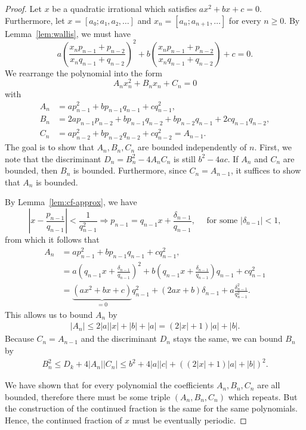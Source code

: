 \begin{proof}
  Let $x$ be a quadratic irrational which satisfies $ax^2 + bx + c = 0$.
  Furthermore, let $x = [a₀; a₁, a₂, …]$ and $x_n = [a_n; a_{n+1}, …]$ for every $n ≥ 0$.
  By Lemma~\ref{lem:wallis}, we must have
  \[
    a \left(\frac{x_n p_{n-1} + p_{n-2}}{x_n q_{n-1} + q_{n-2}}\right)^2
    + b \left(\frac{x_n p_{n-1} + p_{n-2}}{x_n q_{n-1} + q_{n-2}}\right)
    + c = 0.
  \]
  We rearrange the polynomial into the form
  \[
    A_n x_n^2 + B_n x_n + C_n = 0
  \]
  with
  \begin{align*}
    A_n & = a p_{n-1}^2 + b p_{n-1} q_{n-1} + c q_{n-1}^2, \\
    B_n & = 2a p_{n-1} p_{n-2} + b p_{n-1} q_{n-2} + b p_{n-2} q_{n-1} + 2c q_{n-1} q_{n-2}, \\
    C_n & = a p_{n-2}^2 + b p_{n-2} q_{n-2} + c q_{n-2}^2 = A_{n-1}.
  \end{align*}
  The goal is to show that $A_n, B_n, C_n$ are bounded independently of $n$.
  First, we note that the discriminant $D_n = B_n^2 - 4 A_n C_n$ is still $b^2 - 4ac$.
  If $A_n$ and $C_n$ are bounded, then $B_n$ is bounded.
  Furthermore, since $C_n = A_{n-1}$, it suffices to show that $A_n$ is bounded.

  By Lemma~\ref{lem:cf-approx}, we have
  \[
    \left| x - \frac{p_{n-1}}{q_{n-1}} \right| < \frac{1}{q_{n-1}^2}
    \Rightarrow
    p_{n-1} = q_{n-1} x + \frac{δ_{n-1}}{q_{n-1}}, \quad \text{ for some } |δ_{n-1}| < 1,
  \]
  from which it follows that
  \begin{align*}
    A_n & = a p_{n-1}^2 + b p_{n-1} q_{n-1} + c q_{n-1}^2, \\
    & = a \left( q_{n-1} x + \frac{δ_{n-1}}{q_{n-1}} \right)^2 + b \left( q_{n-1} x + \frac{δ_{n-1}}{q_{n-1}} \right) q_{n-1} + c q_{n-1}^2 \\
    & = \underbrace{(ax^2 + bx + c)}_{ = 0} q_{n-1}^2 + (2ax + b) δ_{n-1} + a \frac{δ_{n-1}^2}{q_{n-1}^2}.
  \end{align*}
  This allows us to bound $A_n$ by
  \begin{align*}
    |A_n| ≤ 2|a||x| + |b| + |a| = (2 |x| + 1) |a| + |b|.
  \end{align*}
  Because $C_n = A_{n-1}$ and the discriminant $D_n$ stays the same, we can
  bound $B_n$ by
  \begin{align*}
    B_n^2 ≤ D_k + 4 |A_n| |C_n| ≤ b^2 + 4 |a| |c| + ((2 |x| + 1)|a| + |b|)^2.
  \end{align*}

  We have shown that for every polynomial the coefficients $A_n, B_n, C_n$ are all bounded,
  therefore there must be some triple $(A_n, B_n, C_n)$ which repeats.
  But the construction of the continued fraction is the same for the same polynomials.
  Hence, the continued fraction of $x$ must be eventually periodic.
\end{proof}

